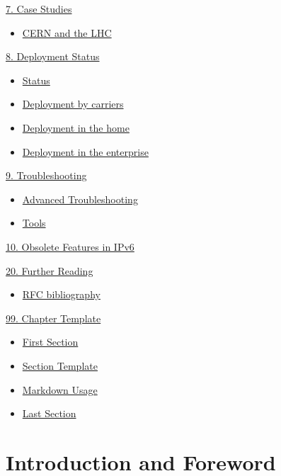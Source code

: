 \documentclass[
]{article}
\providecommand{\tightlist}{%
  \setlength{\itemsep}{0pt}\setlength{\parskip}{0pt}}
\begin{document}
\hyperref[case-studies]{7. Case Studies}

\begin{itemize}
\tightlist
\item
  \hyperref[cern-and-the-lhc]{CERN and the LHC}
\end{itemize}

\hyperref[deployment-status]{8. Deployment Status}

\begin{itemize}
\tightlist
\item
  \hyperref[status]{Status}
\item
  \hyperref[deployment-by-carriers]{Deployment by carriers}
\item
  \hyperref[deployment-in-the-home]{Deployment in the home}
\item
  \hyperref[deployment-in-the-enterprise]{Deployment in the enterprise}
\end{itemize}

\hyperref[troubleshooting]{9. Troubleshooting}

\begin{itemize}
\tightlist
\item
  \hyperref[advanced-troubleshooting]{Advanced Troubleshooting}
\item
  \hyperref[tools]{Tools}
\end{itemize}

\hyperref[obsolete-features-in-ipv6]{10. Obsolete Features in IPv6}

\hyperref[further-reading]{20. Further Reading}

\begin{itemize}
\tightlist
\item
  \hyperref[rfc-bibliography]{RFC bibliography}
\end{itemize}

\hyperref[chapter-template]{99. Chapter Template}

\begin{itemize}
\tightlist
\item
  \hyperref[first-section]{First Section}
\item
  \hyperref[section-template]{Section Template}
\item
  \hyperref[markdown-usage]{Markdown Usage}
\item
  \hyperref[last-section]{Last Section}
\end{itemize}

\pagebreak

\section{Introduction and Foreword}\label{introduction-and-foreword}
\end{document}
